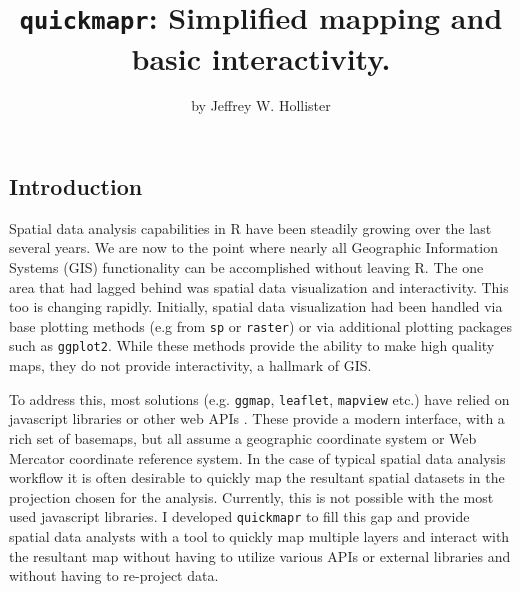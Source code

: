 \title{\texttt{quickmapr}: Simplified mapping and basic interactivity.}
\author{by Jeffrey W. Hollister}

\maketitle


\subsection{Introduction}\label{introduction}

Spatial data analysis capabilities in R have been steadily growing over
the last several years. We are now to the point where nearly all
Geographic Information Systems (GIS) functionality can be accomplished
without leaving R. The one area that had lagged behind was spatial data
visualization and interactivity. This too is changing rapidly.
Initially, spatial data visualization had been handled via base plotting
methods (e.g from \texttt{sp} or \texttt{raster}) or via additional
plotting packages such as
\texttt{ggplot2}\citep{pebesma2005classes, bivand2013asdar, raster, ggplot2}.
While these methods provide the ability to make high quality maps, they
do not provide interactivity, a hallmark of GIS.

To address this, most solutions (e.g. \texttt{ggmap}, \texttt{leaflet},
\texttt{mapview} etc.) have relied on javascript libraries or other web
APIs \citep{ggmap, leaflet, mapview}. These provide a modern interface,
with a rich set of basemaps, but all assume a geographic coordinate
system or Web Mercator coordinate reference system. In the case of
typical spatial data analysis workflow it is often desirable to quickly
map the resultant spatial datasets in the projection chosen for the
analysis. Currently, this is not possible with the most used javascript
libraries. I developed \texttt{quickmapr} to fill this gap and provide
spatial data analysts with a tool to quickly map multiple layers and
interact with the resultant map without having to utilize various APIs
or external libraries and without having to re-project data.

